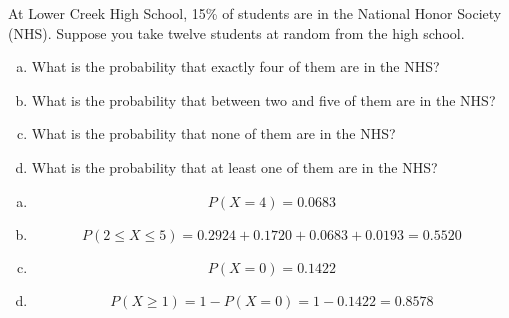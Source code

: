 \documentclass[11pt,letterpaper]{article}
\begin{document}
\newpage



 At Lower Creek High School, 15\% of students are in the National Honor Society (NHS). Suppose you take twelve students at random from the high school.
	\begin{enumerate}[(a)]
	\item What is the probability that exactly four of them are in the NHS?
	\item What is the probability that between two and five of them are in the NHS?
	\item What is the probability that none of them are in the NHS?
	\item What is the probability that at least one of them are in the NHS?
	\end{enumerate} \pspace

\sol 
\begin{enumerate}[(a)]
\item 
	\[
	P(X= 4)= 0.0683
	\] \pspace

\item 
	\[
	P(2 \leq X \leq 5)= 0.2924 + 0.1720 + 0.0683 + 0.0193= 0.5520
	\] \pspace

\item 
	\[
	P(X= 0)= 0.1422
	\] \pspace

\item 
	\[
	P(X \geq 1)= 1 - P(X= 0)= 1 - 0.1422= 0.8578
	\]
\end{enumerate}
\end{document}
